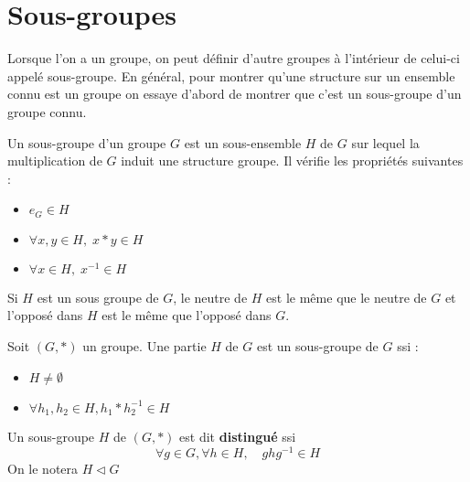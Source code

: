 
\newpage
\section{Sous-groupes}

Lorsque l'on a un groupe, on peut définir d'autre groupes à l'intérieur de celui-ci appelé sous-groupe. 
En général, pour montrer qu'une structure sur un ensemble connu est un groupe on essaye d'abord de montrer que c'est un 
sous-groupe d'un groupe connu. 

\begin{definition}
    Un sous-groupe d'un groupe $G$ est un sous-ensemble $H$ de $G$ sur lequel la multiplication de $G$ induit une structure groupe.
    Il vérifie les propriétés suivantes :
    \begin{itemize}
        \item $ e_G \in H $
        \item $ \forall x, y \in H, \; x * y \in H $
        \item $ \forall x \in H, \; x^{-1} \in H $
    \end{itemize}
\end{definition}

\begin{theorem}
    Si $H$ est un sous groupe de $G$, le neutre de $H$ est le même que le neutre de $G$ et l'opposé dans $H$ est le même que l'opposé dans $G$.
\end{theorem}

\begin{proposition}
    Soit $(G,*)$ un groupe. Une partie $H$ de $G$ est un sous-groupe de $G$ ssi :
    \begin{itemize}
        \item $H \not = \emptyset $
        \item $ \forall h_1, h_2 \in H, h_1 * h_2^{-1} \in H $
    \end{itemize}
\end{proposition}


\begin{definition}
    Un sous-groupe $H$ de $(G,*)$ est dit \textbf{distingué} ssi 
        \[ \forall g \in G, \forall h \in H, \quad ghg^{-1} \in H \] 
    On le notera $ H \triangleleft G $
\end{definition}

